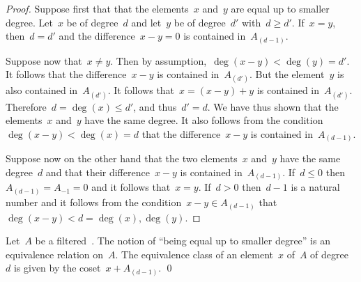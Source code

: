 \begin{proof}
	Suppose first that that the elements~$x$ and~$y$ are equal up to smaller degree.
	Let~$x$ be of degree~$d$ and let~$y$ be of degree~$d'$ with~$d \geq d'$.
	If~$x = y$, then~$d = d'$ and the difference~$x - y = 0$ is contained in~$A_{(d-1)}$.

	Suppose now that~$x \neq y$.
	Then by assumption,~$\deg(x - y) < \deg(y) = d'$.
	It follows that the difference~$x - y$ is contained in~$A_{(d')}$.
	But the element~$y$ is also contained in~$A_{(d')}$.
	It follows that~$x = (x-y) + y$ is contained in~$A_{(d')}$.
	Therefore~$d = \deg(x) \leq d'$, and thus~$d' = d$.
	We have thus shown that the elements~$x$ and~$y$ have the same degree.
	It also follows from the condition~$\deg(x - y) < \deg(x) = d$ that the difference~$x - y$ is contained in~$A_{(d-1)}$.

	Suppose now on the other hand that the two elements~$x$ and~$y$ have the same degree~$d$ and that their difference~$x - y$ is contained in~$A_{(d-1)}$.
	If~$d \leq 0$ then~$A_{(d-1)} = A_{-1} = 0$ and it follows that~$x = y$.
	If~$d > 0$ then~$d-1$ is a natural number and it follows from the condition~$x - y \in A_{(d-1)}$ that~$\deg(x-y) < d = \deg(x), \deg(y)$.
\end{proof}


\begin{corollary}
	Let~$A$ be a filtered~\algebra{$\kf$}.
	The notion of \enquote{being equal up to smaller degree} is an equivalence relation on~$A$.
	The equivalence class of an element~$x$ of~$A$ of degree~$d$ is given by the coset~$x + A_{(d-1)}$.
	\qed
\end{corollary}


